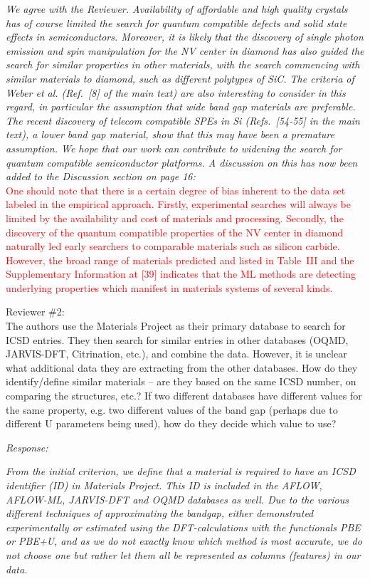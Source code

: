 \documentclass[11pt, a4paper]{letter} %
\newcommand{\mrk}[1]{\textcolor{red}{#1}}
\begin{document}
\textit{We agree with the Reviewer. Availability of affordable and high quality crystals has of course limited the search for quantum compatible defects and solid state effects in semiconductors. Moreover, it is likely that the discovery of single photon emission and spin manipulation for the NV center in diamond has also guided the search for similar properties in other materials, with the search commencing with similar materials to diamond, such as different polytypes of SiC. The criteria of Weber \textit{et al.} (Ref.~[8] of the main text) are also interesting to consider in this regard, in particular the assumption that wide band gap materials are preferable. The recent discovery of telecom compatible SPEs in Si (Refs.~[54-55] in the main text), a lower band gap material, show that this may have been a premature assumption. We hope that our work can contribute to widening the search for quantum compatible semiconductor platforms. 
A discussion on this has now been added to the Discussion section on page 16: } \\ 
\mrk{One should note that there is a certain degree of bias inherent to the data set labeled in the empirical approach. Firstly, experimental searches will always be limited by the availability and cost of materials and processing. Secondly, the discovery of the quantum compatible properties of the NV center in diamond naturally led early searchers to comparable materials such as silicon carbide. However, the broad range of materials predicted and listed in Table~III and the Supplementary Information at [39] indicates that the ML methods are detecting underlying properties which manifest in materials systems of several kinds. }

Reviewer \#2: \\
The authors use the Materials Project as their primary database to search for ICSD entries. They then search for similar entries in other databases (OQMD, JARVIS-DFT, Citrination, etc.), and combine the data. However, it is unclear what additional data they are extracting from the other databases. How do they identify/define similar materials – are they based on the same ICSD number, on comparing the structures, etc.? If two different databases have different values for the same property, e.g. two different values of the band gap (perhaps due to different U parameters being used), how do they decide which value to use?

\textit{Response:}

\textit{From the initial criterion, we define that a material is required to have an ICSD identifier (ID) in Materials Project. This ID is included in the AFLOW, AFLOW-ML, JARVIS-DFT and OQMD databases as well. Due to the various different techniques of approximating the bandgap, either demonstrated experimentally or estimated using the DFT-calculations with the functionals PBE or PBE+U, and as we do not exactly know which method is most accurate, we do not choose one but rather let them all be represented as columns (features) in our data.}
\end{document}
